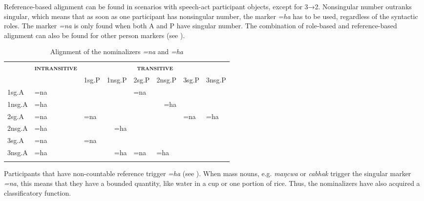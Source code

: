 Reference-based alignment can be found in scenarios with speech-act participant objects, except for 3→2. Nonsingular number outranks singular, which means that as soon as one participant has nonsingular number, the marker \emph{=ha} has to be used, regardless of the syntactic roles. The marker \emph{=na} is only found when both A and P have singular number. The combination of role-based and reference-based alignment can also be found for other person markers (see ).

\begin{table}[htp]
\begin{center} 
\begin{tabular}{lll|l|l|l|l|l}
\lsptoprule
		& \multirow{2}{*}{{\bf \textsc{intransitive}}}	&	\multicolumn{6}{c}{ {\bf \textsc{transitive}}} \\
		\cline{3-8}
		&		&{\sc 1sg.P}& {\sc 1nsg.P}&{\sc 2sg.P}&{\sc 2nsg.P}&{\sc 3sg.P}&{\sc 3nsg.P}\\
\hline %
 {\sc 1sg.A} 		& =na& \multicolumn{2}{c|}{\cellcolor[gray]{.8}}&=na& & &\\
 \cline{5-5} 		
{\sc 1nsg.A} 		&=ha & \multicolumn{2}{c|}{\cellcolor[gray]{.8}}&\multicolumn{2}{r|}{=ha}&&\\
 \cline{3-6}
{\sc 2sg.A} 		&=na&=na	&&\multicolumn{2}{c|}{\cellcolor[gray]{.8}} &=na&=ha\\
\cline{3-3}
{\sc 2nsg.A}		&=ha&	\multicolumn{2}{r|}{=ha} &\multicolumn{2}{c|}{\cellcolor[gray]{.8}} &&\\ 
 \cline{3-6}
{\sc 3sg.A}		&=na&=na&& & &&\\
\cline{3-3}
{\sc 3nsg.A}	& =ha&\multicolumn{2}{r|}{=ha}&=na  &=ha&&\\
\lspbottomrule
\end{tabular}
\caption{Alignment of the nominalizers \emph{=na} and \emph{=ha}}\label{nmlz-uni-table}
\end{center}
\end{table}     

Participants that have non-countable reference trigger \emph{=ha} (see \Next). When mass nouns, e.g. \emph{maŋcwa}  or \emph{cabhak}  trigger the singular marker \emph{=na}, this means that they have a bounded quantity, like water in a cup or one portion of rice. Thus, the nominalizers have also acquired a classificatory function.


